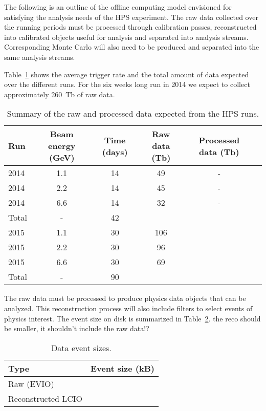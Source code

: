 
The following is an outline of the offline computing model envisioned for satisfying the analysis needs of the HPS experiment. The raw data collected over the running periods must be processed through calibration passes, reconstructed into calibrated objects useful for analysis and separated into analysis streams. Corresponding Monte Carlo will also need to be produced and separated into the same analysis streams.

Table~\ref{tab:data_size} shows the average trigger rate and the total amount of data expected over the 
different runs. For the six weeks long run in 2014 we expect to collect approximately 260~Tb of raw data.
\begin{table}[]
\centering
\begin{tabular}{|l|c|c|c|c|c|}
\hline
Run & Beam energy (GeV) & Time (days) & Raw data (Tb) & Processed data (Tb)\\
\hline
2014 & 1.1 & 14 & 49 & - \\
2014 & 2.2 & 14 & 45 & -  \\
2014 & 6.6 & 14 & 32 & -  \\
\hline
Total & - & 42 &  &  & \\
\hline
2015 & 1.1 & 30 & 106 & \\
2015 & 2.2 & 30 & 96 & \\
2015 & 6.6 & 30 & 69 & \\
\hline
Total & - & 90 & & \\
\hline
\end{tabular}
\caption{{\small Summary of the raw and processed data expected from the HPS runs. }}
\label{tab:data_size}
\end{table}
The raw data must be processed to produce physics data objects that can be analyzed. This reconstruction process will also include filters to select events of physics interest. The event size on disk is summarized 
in Table~\ref{tab:raw_data_size}. {\color{red} the reco should be smaller, it shouldn't include the raw data!?}
\begin{table}[]
\centering
\begin{tabular}{|l|c|}
\hline
Type & Event size (kB) \\ 
\hline
Raw (EVIO)  &  \\
\hline
Reconstructed LCIO & \\
\hline
\end{tabular}
\caption{{\small Data event sizes. }}
\label{tab:raw_data_size}
\end{table}

